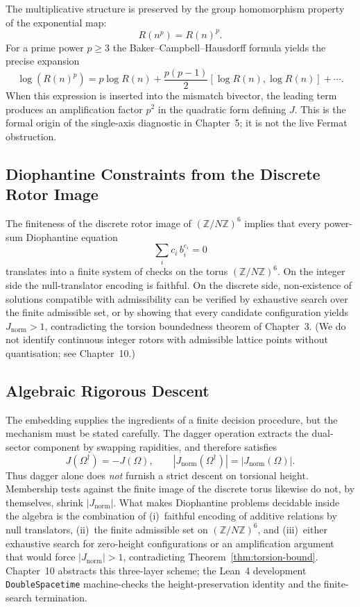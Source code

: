 \documentclass[a4paper]{article}
\theoremstyle{definition}
\theoremstyle{remark}
\newcommand{\Jnorm}{J_{\mathrm{norm}}}
\begin{document}
The multiplicative structure is preserved by the group homomorphism property of the exponential map:
\[
R(n^p) = R(n)^p.
\]
For a prime power \( p \geq 3 \) the Baker--Campbell--Hausdorff formula yields the precise expansion
\[
\log(R(n)^p) = p \log R(n) + \frac{p(p-1)}{2} [\log R(n), \log R(n)] + \cdots.
\]
When this expression is inserted into the mismatch bivector, the leading term produces an amplification factor \( p^2 \) in the quadratic form defining \( J \). This is the formal origin of the single-axis diagnostic in Chapter~5; it is not the live Fermat obstruction.

\subsection{Diophantine Constraints from the Discrete Rotor Image}

The finiteness of the discrete rotor image of \((\mathbb{Z}/N\mathbb{Z})^6\) implies that every power-sum Diophantine equation
\[
\sum_i c_i\, b_i^{e_i} = 0
\]
translates into a finite system of checks on the torus \( (\mathbb{Z}/N\mathbb{Z})^6 \). On the integer side the null-translator encoding is faithful. On the discrete side, non-existence of solutions compatible with admissibility can be verified by exhaustive search over the finite admissible set, or by showing that every candidate configuration yields \( \Jnorm > 1 \), contradicting the torsion boundedness theorem of Chapter~3. (We do not identify continuous integer rotors with admissible lattice points without quantisation; see Chapter~10.)


\subsection{Algebraic Rigorous Descent}

\label{sec:ch4-descent}
The embedding supplies the ingredients of a finite decision procedure, but the mechanism must be stated carefully. The dagger operation extracts the dual-sector component by swapping rapidities, and therefore satisfies
\[
J(\Omega^\dagger)=-J(\Omega),\qquad |\Jnorm(\Omega^\dagger)|=|\Jnorm(\Omega)|.
\]
Thus dagger alone does \emph{not} furnish a strict descent on torsional height. Membership tests against the finite image of the discrete torus likewise do not, by themselves, shrink \(|\Jnorm|\). What makes Diophantine problems decidable inside the algebra is the combination of (i)~faithful encoding of additive relations by null translators, (ii)~the finite admissible set on \((\mathbb{Z}/N\mathbb{Z})^6\), and (iii)~either exhaustive search for zero-height configurations or an amplification argument that would force \(|\Jnorm|>1\), contradicting Theorem~\ref{thm:torsion-bound}. Chapter~10 abstracts this three-layer scheme; the Lean~4 development \texttt{DoubleSpacetime} machine-checks the height-preservation identity and the finite-search termination.
\end{document}
